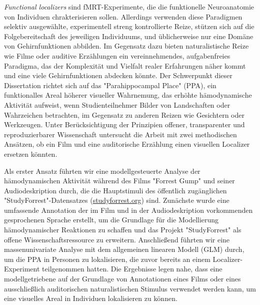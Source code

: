 \textit{Functional localizers} sind fMRT-Experimente, die die funktionelle
Neuroanatomie von Individuen chrakterisieren sollen.
Allerdings verwenden diese Paradigmen selektiv ausgewählte, experimentell
streng kontrollierte Reize, stützen sich auf die Folgebereitschaft des
jeweiligen Individuums, und üblicherweise nur eine Domäne von Gehirnfunktionen
abbilden.
%
Im Gegensatz dazu bieten naturalistische Reize wie Filme oder auditive
Erzählungen ein vereinnehmendes, aufgabenfreies Paradigma, das der Komplexität
und Vielfalt realer Erfahrungen näher kommt und eine viele Gehirnfunktionen
abdecken könnte.
Der Schwerpunkt dieser Dissertation richtet sich auf das "Parahippocampal
Place" (PPA), ein funktionalles Areal höherer visueller Wahrnemung, das erhöhte
hämodynamische Aktivität aufweist, wenn Studienteilnehmer Bilder von
Landschaften oder Wahrzeichen betrachten, im Gegensatz zu anderen Reizen wie
Gesichtern oder Werkzeugen.
%
Unter Berücksichtigung der Prinzipien offener, transparenter und
reproduzierbarer Wissenschaft untersucht die Arbeit mit zwei methodischen
Ansätzen, ob ein Film und eine auditorische Erzählung einen visuellen Localizer
ersetzen könnten.

Als erster Ansatz führten wir eine modellgesteuerte Analyse der hämodynamischen
Aktivität während des Films "Forrest Gump" und seiner Audiodeskription durch,
die die Hauptstimuli des öffentlich zugänglichen "StudyForrest"-Datensatzes
(\href{www.studyforrest.org}{\url{studyforrest.org}}) sind.
%
Zunächste wurde eine umfassende Annotation der im Film und in der
Audiodeskription vorkommenden gesprochenen Sprache erstellt, um die Grundlage
für die Modellierung hämodynamischer Reaktionen zu schaffen und das Projekt
"StudyForrest" als offene Wissenschaftsressource zu erweitern.
%
Anschließend führten wir eine massenunivariate Analyse mit dem allgemeinen
linearen Modell (GLM) durch, um die PPA in Personen zu lokalisieren, die zuvor
bereits an einem Localizer-Experiment teilgenommen hatten.
Die Ergebnisse legen nahe, dass eine modellgetriebene auf der Grundlage von
Annotationen eines Films oder eines ausschließlich auditorischen
naturalistischen Stimulus verwendet werden kann, um eine visuelles Areal in
Individuen lokalisieren zu können.


